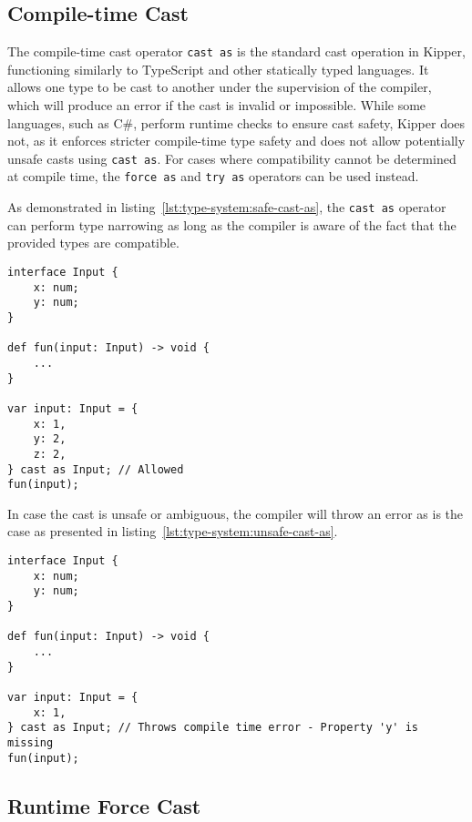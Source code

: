 \subsection{Compile-time Cast}

The compile-time cast operator \lstinline|cast as| is the standard cast operation in Kipper, functioning similarly to TypeScript and other statically typed languages. It allows one type to be cast to another under the supervision of the compiler, which will produce an error if the cast is invalid or impossible. While some languages, such as C\#, perform runtime checks to ensure cast safety, Kipper does not, as it enforces stricter compile-time type safety and does not allow potentially unsafe casts using \lstinline|cast as|. For cases where compatibility cannot be determined at compile time, the \lstinline|force as| and \lstinline|try as| operators can be used instead.

As demonstrated in listing~\ref{lst:type-system:safe-cast-as}, the \lstinline|cast as| operator can perform type narrowing as long as the compiler is aware of the fact that the provided types are compatible. 

\begin{lstlisting}[language=Kipper,caption=Correctly casting an object to an interface using the \lstinline|cast as| operator,label=lst:type-system:safe-cast-as]
interface Input {
	x: num;
	y: num;
}

def fun(input: Input) -> void {
	...
}

var input: Input = {
	x: 1,
	y: 2,
	z: 2,
} cast as Input; // Allowed
fun(input);
\end{lstlisting}

In case the cast is unsafe or ambiguous, the compiler will throw an error as is the case as presented in listing~\ref{lst:type-system:unsafe-cast-as}.

\begin{lstlisting}[language=Kipper,caption=Incorrectly casting an object to an interface using the \lstinline|cast as| operator,label=lst:type-system:unsafe-cast-as]
interface Input {
	x: num;
	y: num;
}

def fun(input: Input) -> void {
	...
}

var input: Input = {
	x: 1,
} cast as Input; // Throws compile time error - Property 'y' is missing
fun(input);
\end{lstlisting}

\subsection{Runtime Force Cast}

